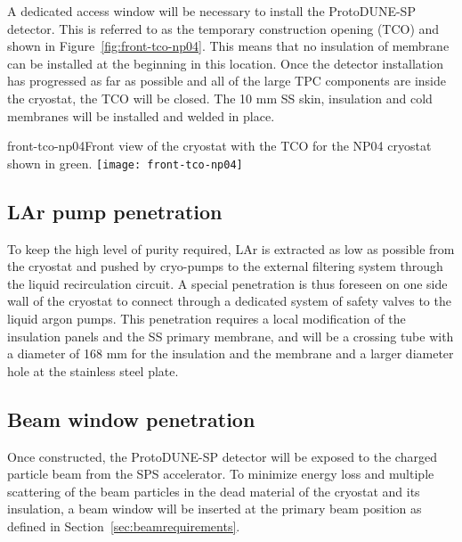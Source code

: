 A dedicated access window will be necessary to install the ProtoDUNE-SP detector.  This is referred to as the temporary construction opening (TCO) and shown in Figure~\ref{fig:front-tco-np04}.  This means that no insulation of membrane can be installed at the beginning in this location. Once the detector installation has progressed as far as possible and all of the large TPC components are inside the cryostat, the TCO will be closed.  The 10 mm SS skin, insulation and cold membranes will be installed and welded in place. 

\begin{cdrfigure}{front-tco-np04}{Front view of the cryostat with the TCO for the NP04 cryostat shown in green.}
  \texttt{[image: front-tco-np04]}
\end{cdrfigure}


\subsection{LAr pump penetration}

To keep the high level of purity required, LAr is extracted as low as possible from the cryostat and pushed by cryo-pumps 
to the external filtering system through the liquid recirculation circuit. A special penetration is thus foreseen on one side wall of the cryostat to connect through a dedicated system of safety valves to the liquid argon pumps.
This penetration requires a local modification of the insulation panels and the SS primary membrane, and will be a crossing tube with a diameter of 168 mm for the insulation and the membrane and a larger diameter hole at the stainless steel plate.

\subsection{Beam window penetration}
\label{subsec:beamwindow}
Once constructed, the ProtoDUNE-SP detector will be exposed to the charged
particle beam from the SPS accelerator. To minimize energy loss and
multiple scattering of the beam particles in the dead material of the
cryostat and its insulation, a beam window will be inserted at the primary beam position as defined  in Section~\ref{sec:beamrequirements}. 

